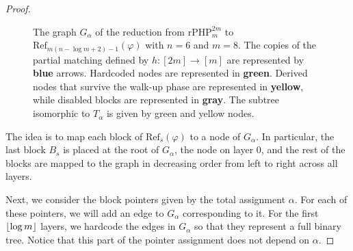 \begin{proof}
\begin{figure}[t]
{
        }
        \caption{The graph $G_{\alpha}$ of the reduction from $\mathrm{rPHP}^{2m}_m$ to $\mathrm{Ref}_{m(n-\log m +2)-1}(\varphi)$ with $n = 6$ and $m = 8$. The copies of the partial matching defined by $h : [2m] \to [m]$ are represented by \textcolor{blue!70!black}{\textbf{blue}} arrows. Hardcoded nodes are represented in \textcolor{green!60!black}{\textbf{green}}. Derived nodes that survive the walk-up phase are represented in \textcolor{yellow!80!black}{\textbf{yellow}}, while disabled blocks are represented in \textcolor{gray!70}{\textbf{gray}}. The subtree isomorphic to $T_\alpha$ is given by green and yellow nodes.}
        \label{fig:rphp_to_ref}
    \end{figure}
    
    The idea is to map each block of $\mathrm{Ref}_{s}(\varphi)$ to a node of $G_\alpha$. In particular, the last block $B_{s}$ is placed at the root of $G_\alpha$, the node on layer 0, and the rest of the blocks are mapped to the graph in decreasing order from left to right across all layers.
    
    Next, we consider the block pointers given by the total assignment $\alpha$. For each of these pointers, we will add an edge to $G_\alpha$ corresponding to it. For the first $\left \lfloor \log m \right \rfloor$ layers, we hardcode the edges in $G_\alpha$ so that they represent a full binary tree. Notice that this part of the pointer assignment does not depend on $\alpha$.
    

\end{proof}
